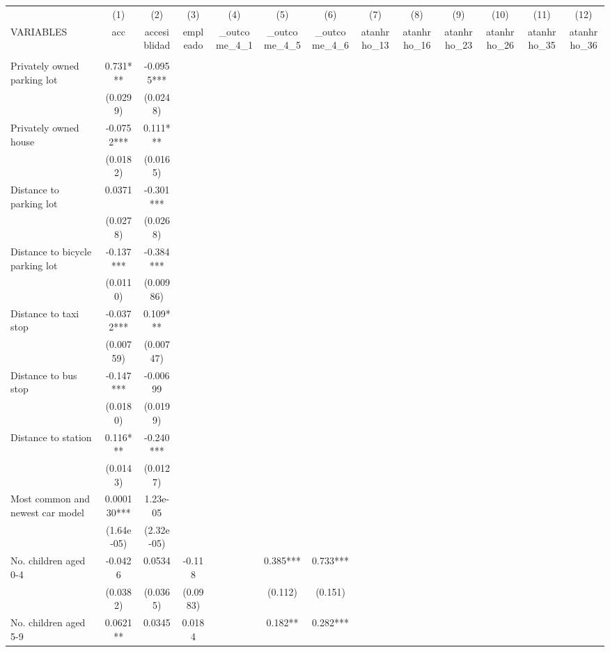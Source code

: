 \documentclass[]{article}
\begin{document}
\begin{tabular}{lcccccccccccc} \hline
 & (1) & (2) & (3) & (4) & (5) & (6) & (7) & (8) & (9) & (10) & (11) & (12) \\
VARIABLES & acc & accesiblidad & empleado & \_outcome\_4\_1 & \_outcome\_4\_5 & \_outcome\_4\_6 & atanhrho\_13 & atanhrho\_16 & atanhrho\_23 & atanhrho\_26 & atanhrho\_35 & atanhrho\_36 \\ \hline
 &  &  &  &  &  &  &  &  &  &  &  &  \\
Privately owned parking lot & 0.731*** & -0.0955*** &  &  &  &  &  &  &  &  &  &  \\
 & (0.0299) & (0.0248) &  &  &  &  &  &  &  &  &  &  \\
Privately owned house & -0.0752*** & 0.111*** &  &  &  &  &  &  &  &  &  &  \\
 & (0.0182) & (0.0165) &  &  &  &  &  &  &  &  &  &  \\
Distance to parking lot & 0.0371 & -0.301*** &  &  &  &  &  &  &  &  &  &  \\
 & (0.0278) & (0.0268) &  &  &  &  &  &  &  &  &  &  \\
Distance to bicycle parking lot & -0.137*** & -0.384*** &  &  &  &  &  &  &  &  &  &  \\
 & (0.0110) & (0.00986) &  &  &  &  &  &  &  &  &  &  \\
Distance to taxi stop & -0.0372*** & 0.109*** &  &  &  &  &  &  &  &  &  &  \\
 & (0.00759) & (0.00747) &  &  &  &  &  &  &  &  &  &  \\
Distance to bus stop & -0.147*** & -0.00699 &  &  &  &  &  &  &  &  &  &  \\
 & (0.0180) & (0.0199) &  &  &  &  &  &  &  &  &  &  \\
Distance to  station & 0.116*** & -0.240*** &  &  &  &  &  &  &  &  &  &  \\
 & (0.0143) & (0.0127) &  &  &  &  &  &  &  &  &  &  \\
Most common and newest car model & 0.000130*** & 1.23e-05 &  &  &  &  &  &  &  &  &  &  \\
 & (1.64e-05) & (2.32e-05) &  &  &  &  &  &  &  &  &  &  \\
No. children aged 0-4 & -0.0426 & 0.0534 & -0.118 &  & 0.385*** & 0.733*** &  &  &  &  &  &  \\
 & (0.0382) & (0.0365) & (0.0983) &  & (0.112) & (0.151) &  &  &  &  &  &  \\
No. children aged 5-9 & 0.0621** & 0.0345 & 0.0184 &  & 0.182** & 0.282*** &  &  &  &  &  &  \\

\end{tabular}
\end{document}
